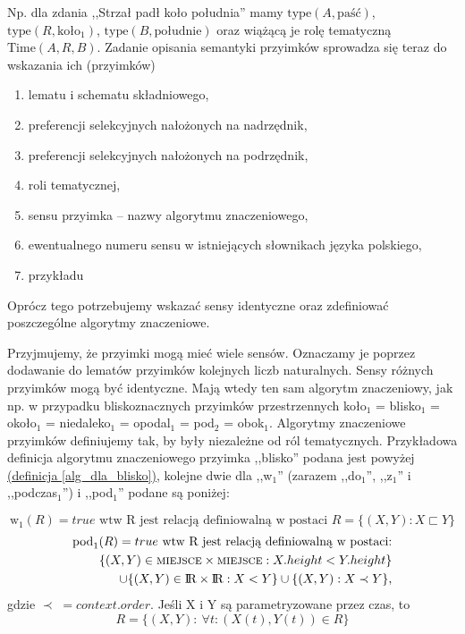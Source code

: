 \documentclass[a4paper, 12pt]{article}
\theoremstyle{remark}
\begin{document}

Np. dla zdania ,,Strzał padł koło południa'' mamy $\text{type}(A,\text{paść})$, 
$\text{type}(R,\text{koło}_1)$, \newline $\text{type}(B,\text{południe})$ oraz wiążącą je rolę tematyczną $\text{Time}(A,R,B)$.
Zadanie opisania semantyki przyimków sprowadza się teraz do wskazania ich (przyimków) 
\begin{enumerate}
\item lematu i schematu składniowego, 
\item preferencji selekcyjnych nałożonych na nadrzędnik, 
\item preferencji selekcyjnych nałożonych na podrzędnik, 
\item roli tematycznej, 
\item sensu przyimka -- nazwy algorytmu znaczeniowego,
\item ewentualnego numeru sensu w istniejących słownikach języka polskiego,
\item przykładu
\end{enumerate}
Oprócz tego potrzebujemy wskazać sensy identyczne oraz zdefiniować poszczególne algorytmy znaczeniowe.

Przyjmujemy, że przyimki mogą mieć wiele sensów.
Oznaczamy je poprzez dodawanie do lematów przyimków kolejnych liczb naturalnych. 
Sensy różnych przyimków mogą być identyczne. Mają wtedy ten sam algorytm znaczeniowy, jak np. w przypadku bliskoznacznych przyimków przestrzennych
koło$_1$ = blisko$_1$ = około$_1$ = niedaleko$_1$ = opodal$_1$ = pod$_2$ = obok$_1$.
Algorytmy znaczeniowe przyimków definiujemy tak, by były niezależne od ról tematycznych. Przykładowa definicja algorytmu znaczeniowego przyimka ,,blisko'' podana jest powyżej \hyperref[alg_dla_blisko]{(definicja \ref*{alg_dla_blisko})}, kolejne dwie dla ,,w$_1$'' (zarazem ,,do$_1$'', ,,z$_1$'' i ,,podczas$_1$'') i ,,pod$_1$'' podane są poniżej:

\begin{equation}
	\text{w}_1(R) = true \text{\ wtw R jest relacją definiowalną w postaci\ }  R = \{(X,Y): X \sqsubset Y\}
\end{equation}
\begin{align} 
\nonumber \text{pod}_1(R) = true \text{\ wtw R jest relacją definiowalną w postaci:}\\
 \{(X,Y) \in \textsc{miejsce} \times \textsc{miejsce}: X.height < Y.height\}\\
 \nonumber \cup \{(X,Y) \in \text{I\!R} \times \text{I\!R}: X < Y\} 
 \cup \{(X,Y): X \prec Y\},
\end{align}
 gdzie $\prec\;=context.order$.
   \newline Jeśli X i Y są parametryzowane przez czas, to
\begin{equation}
	R=\{(X,Y)\!:\ \forall t\!: (X(t),Y(t)) \in R\}
\end{equation}
\end{document}
